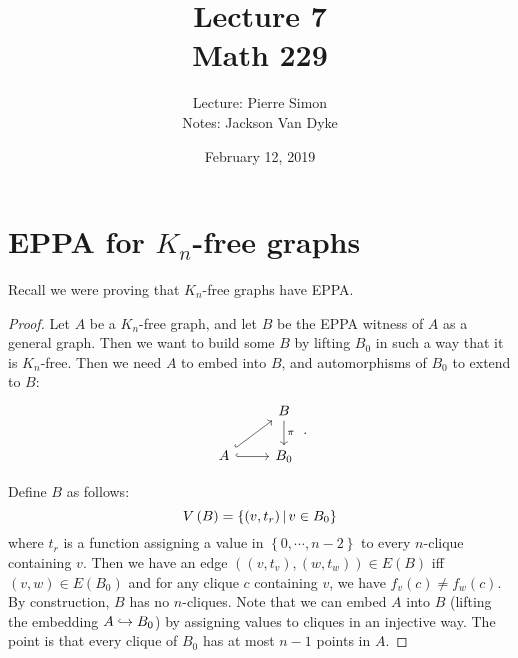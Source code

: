 \documentclass{amsart}
\begin{document}
\title{Lecture 7\\Math 229}
\date{February 12, 2019}
\author{Lecture: Pierre Simon\\Notes: Jackson Van Dyke}
\maketitle

\section{EPPA for $K_n$-free graphs}

Recall we were proving that $K_n$-free graphs have EPPA.

\begin{proof}
Let $A$ be a $K_n$-free graph, and let $B$ be the EPPA witness of $A$ as a general graph.
Then we want to build some $B$ by lifting $B_0$ in such a way that it is $K_n$-free.
Then we need $A$ to embed into $B$, and automorphisms of $B_0$ to extend to $B$:
\begin{equation}
\begin{tikzcd}
& B\arrow{d}{\pi}\\
A\arrow[hook]{r}\arrow[hook]{ur}& B_0
\end{tikzcd}
\ .
\end{equation}

Define $B$ as follows:
\begin{equation}
V\left( B \right) = \left\{ \left( v , t_r \right) \, \middle\vert \, v\in B_0  \right\}
\end{equation}
where $t_r$ is a function assigning a value in $\left\{ 0 , \cdots , n-2 \right\}$ to
every $n$-clique containing $v$. Then we have an edge
$\left( \left( v , t_v \right) , \left( w , t_w \right) \right)\in E\left( B
\right)$ iff $\left( v,w
\right)\in E\left( B_0 \right)$ and for any clique $c$ containing $v$, we have $f_v\left(
c \right)\neq f_w\left( c \right)$.
By construction, $B$ has no $n$-cliques.
Note that we can embed $A$ into $B$ (lifting the embedding $A\hookrightarrow B_0$) by assigning
values to cliques in an injective way.
The point is that every clique of $B_0$ has at most $n-1$ points in $A$.


\end{proof}
\end{document}
